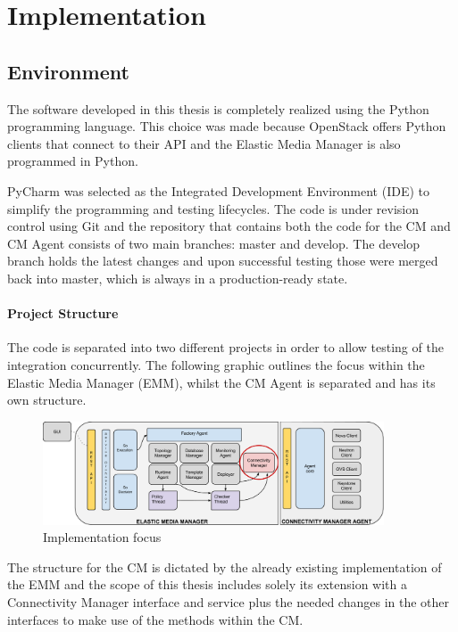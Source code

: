 \chapter{Implementation}


\section{Environment}

The software developed in this thesis is completely realized using the Python programming language. This choice was made because OpenStack offers Python clients that connect to their API and the Elastic Media Manager is also programmed in Python.

PyCharm was selected as the Integrated Development Environment (IDE) to simplify the programming and testing lifecycles. The code is under revision control using Git and the repository that contains both the code for the CM and CM Agent consists of two main branches: master and develop. The develop branch holds the latest changes and upon successful testing those were merged back into master, which is always in a production-ready state.

\subsubsection{Project Structure}

The code is separated into two different projects in order to allow testing of the integration concurrently. The following graphic outlines the focus within the Elastic Media Manager (EMM), whilst the CM Agent is separated and has its own structure.

\begin{figure}[H]
\centering

\includegraphics[width=0.9\textwidth]{images/implementation/cm_implementation_focus_overview}

\caption{Implementation focus}
\end{figure}

The structure for the CM is dictated by the already existing implementation of the EMM and the scope of this thesis includes solely its extension with a Connectivity Manager interface and service plus the needed changes in the other interfaces to make use of the methods within the CM.

